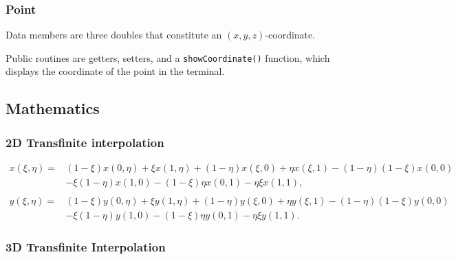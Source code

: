 \documentclass{article}
\newcommand{\ba}[1]{\begin{align*}    #1    \end{align*}}
\begin{document}
\subsubsection{Point}
Data members are three doubles that constitute an $(x,y,z)$-coordinate. 

Public routines are getters, setters, and a \texttt{showCoordinate()} function, which displays the coordinate of the point in the terminal.

\subsection{Mathematics}
\label{sec:Mathematics}

\subsubsection{2D Transfinite interpolation}
\label{sec:2Dtfi}

\ba{
x(\xi,\eta) = &(1-\xi)x(0,\eta)+\xi x(1,\eta)+(1-\eta)x(\xi,0)+\eta x(\xi,1)-(1-\eta)(1-\xi)x(0,0)
\\&-\xi(1-\eta)x(1,0)-(1-\xi)\eta x(0,1)-\eta \xi x(1,1),\\
\\y(\xi, \eta) = &(1-\xi)y(0,\eta)+\xi y(1,\eta)+(1-\eta)y(\xi,0)+\eta y(\xi,1)-(1-\eta)(1-\xi)y(0,0)
\\&-\xi(1-\eta)y(1,0)-(1-\xi)\eta y(0,1)-\eta \xi y(1,1).
}

\subsubsection{3D Transfinite Interpolation}
\label{sec:3Dtfi}
\end{document}
